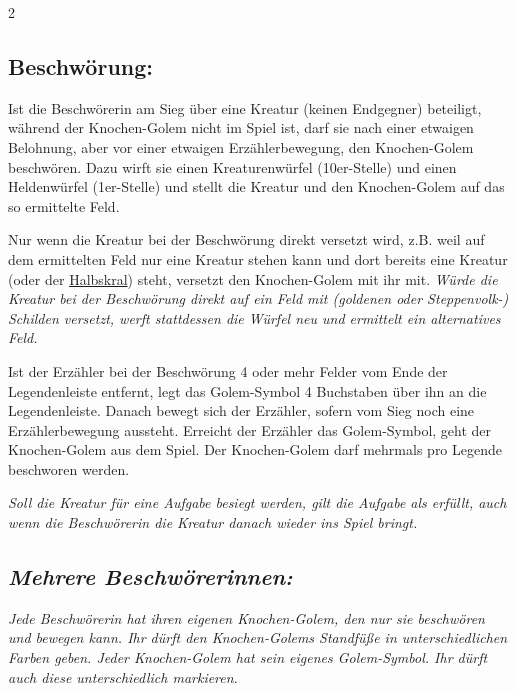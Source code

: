 \documentclass[10pt, a4paper, oneside]{book}
\newcommand{\fan}[1]{\textit{#1}}
\begin{document}
\begin{multicols*}{2}
\begin{nobgcolor}
\subsection{Beschwörung:}

Ist die Beschwörerin am Sieg über eine Kreatur (keinen Endgegner) beteiligt, während der Knochen-Golem nicht im Spiel ist, darf sie nach einer etwaigen Belohnung, aber vor einer etwaigen Erzählerbewegung, den Knochen-Golem beschwören. Dazu wirft sie einen Kreaturenwürfel (10er-Stelle) und einen Heldenwürfel (1er-Stelle) und stellt die Kreatur und den Knochen-Golem auf das so ermittelte Feld.
\supercite{DH:Knochen-Golem}

Nur wenn die Kreatur bei der Beschwörung direkt versetzt wird, z.B. weil auf dem ermittelten Feld nur eine Kreatur stehen kann und dort bereits eine Kreatur (oder der \hyperref[Halbskral]{Halbskral}) steht, versetzt den Knochen-Golem mit ihr mit. 
\supercite{130318}
\fan{Würde die Kreatur bei der Beschwörung direkt auf ein Feld mit (goldenen \fan{oder Steppenvolk-}) Schilden versetzt, werft stattdessen die Würfel neu und ermittelt ein alternatives Feld.}

Ist der Erzähler bei der Beschwörung 4 oder mehr Felder vom Ende der Legendenleiste entfernt, legt das Golem-Symbol 4 Buchstaben über ihn an die Legendenleiste. Danach bewegt sich der Erzähler, sofern vom Sieg noch eine Erzählerbewegung aussteht. Erreicht der Erzähler das Golem-Symbol, geht der Knochen-Golem aus dem Spiel.
\supercite{DH:Knochen-Golem}
Der Knochen-Golem darf mehrmals pro Legende beschworen werden.

\fan{Soll die Kreatur für eine Aufgabe besiegt werden, gilt die Aufgabe als erfüllt, auch wenn die Beschwörerin die Kreatur danach wieder ins Spiel bringt.}









\subsection{\fan{Mehrere Beschwörerinnen:}}

\fan{Jede Beschwörerin hat ihren eigenen Knochen-Golem, den nur sie beschwören und bewegen kann. Ihr dürft den Knochen-Golems Standfüße in unterschiedlichen Farben geben. Jeder Knochen-Golem hat sein eigenes Golem-Symbol. Ihr dürft auch diese unterschiedlich markieren.}


\end{nobgcolor}



\end{multicols*}
\end{document}
